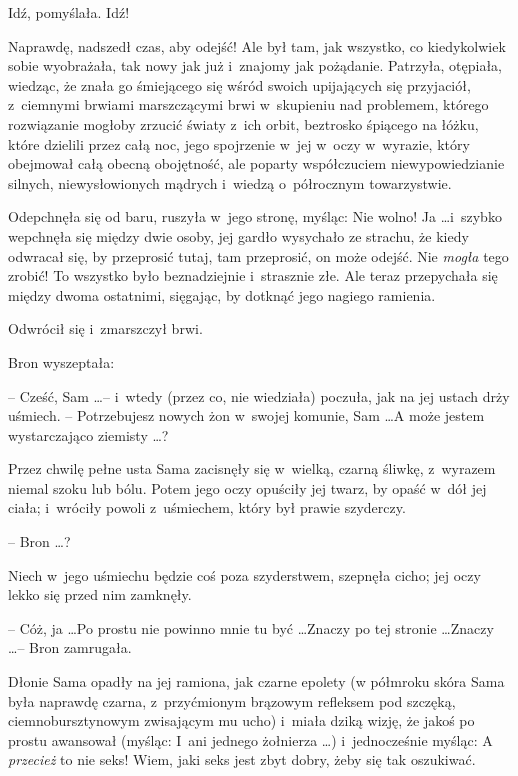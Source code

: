 \documentclass[oneside,polish,11pt,rmheadings]{mwbk}
\begin{document}
Idź, pomyślała. Idź! 

Naprawdę, nadszedł czas, aby odejść! Ale był tam, jak wszystko, co kiedykolwiek sobie wyobrażała, tak nowy jak już i~znajomy jak pożądanie. Patrzyła, otępiała, wiedząc, że znała go śmiejącego się wśród swoich upijających się przyjaciół, z~ciemnymi brwiami marszczącymi brwi w~skupieniu nad problemem, którego rozwiązanie mogłoby zrzucić światy z~ich orbit, beztrosko śpiącego na łóżku, które dzielili przez całą noc, jego spojrzenie w~jej w~oczy w~wyrazie, który obejmował całą obecną obojętność, ale poparty współczuciem niewypowiedzianie silnych, niewysłowionych mądrych i~wiedzą o~półrocznym towarzystwie. 

Odepchnęła się od baru, ruszyła w~jego stronę, myśląc: Nie wolno! Ja \ldots  i~szybko wepchnęła się między dwie osoby, jej gardło wysychało ze strachu, że kiedy odwracał się, by przeprosić tutaj, tam przeprosić, on może odejść. Nie \textit{mogła }tego zrobić! To wszystko było beznadziejnie i~strasznie złe. Ale teraz przepychała się między dwoma ostatnimi, sięgając, by dotknąć jego nagiego ramienia. 

Odwrócił się i~zmarszczył brwi. 

Bron wyszeptała: 

-- Cześć, Sam \ldots  -- i~wtedy (przez co, nie wiedziała) poczuła, jak na jej ustach drży uśmiech. -- Potrzebujesz nowych żon w~swojej komunie, Sam \ldots   A może jestem wystarczająco ziemisty \ldots ? 

Przez chwilę pełne usta Sama zacisnęły się w~wielką, czarną śliwkę, z~wyrazem niemal szoku lub bólu. Potem jego oczy opuściły jej twarz, by opaść w~dół jej ciała; i~wróciły powoli z~uśmiechem, który był prawie szyderczy. 

-- Bron \ldots ? 

Niech w~jego uśmiechu będzie coś poza szyderstwem, szepnęła cicho; jej oczy lekko się przed nim zamknęły. 

-- Cóż, ja \ldots  Po prostu nie powinno mnie tu być \ldots  Znaczy po tej stronie \ldots  Znaczy \ldots  -- Bron zamrugała. 

Dłonie Sama opadły na jej ramiona, jak czarne epolety (w półmroku skóra Sama była naprawdę czarna, z~przyćmionym brązowym refleksem pod szczęką, ciemnobursztynowym zwisającym mu ucho) i~miała dziką wizję, że jakoś po prostu awansował (myśląc: I~ani jednego żołnierza \ldots ) i~jednocześnie myśląc: A \textit{przecież }to nie seks! Wiem, jaki seks jest zbyt dobry, żeby się tak oszukiwać. 
\end{document}
